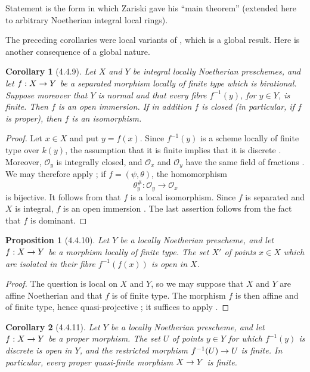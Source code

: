 \documentclass[oneside]{amsart}
\theoremstyle{ega-env-style}
\theoremstyle{ega-thm-env-style}
\newtheorem*{proposition}{Proposition}
\newtheorem*{corollary}{Corollary}
\theoremstyle{ega-defn-env-style}
\def\mathcal{\mathscr}
\def\sh{\mathcal}                   %
\def\kres{k}                        %
\renewcommand{\to}{\mathchoice{\longrightarrow}{\rightarrow}{\rightarrow}{\rightarrow}}
\newcommand{\oldpage}[2][]{{\marginnote{\normalfont{\textbf{#1}~|~#2}}}\ignorespaces}
\let\EGAOriginalLabel\label
\renewcommand{\label}[1]{\phantomsection\EGAOriginalLabel{#1}}
\begin{document}
Statement  is the form in which Zariski gave his
``main theorem'' (extended here to arbitrary Noetherian integral
local rings).

The preceding corollaries were local variants of
, which is a global result.  Here is another
consequence of a global nature.

\begin{corollary}[4.4.9]
\label{III.4.4.9}
Let $X$ and $Y$ be integral locally Noetherian preschemes, and let
$f:X\to Y$ be a separated morphism locally of finite type which is
birational.  Suppose moreover that $Y$ is normal and that every
fibre $f^{-1}(y)$, for $y\in Y$, is finite.  Then $f$ is an open
immersion.  If in addition $f$ is closed (in particular, if $f$ is
proper), then $f$ is an isomorphism.
\end{corollary}

\begin{proof}
Let $x\in X$ and put $y=f(x)$.  Since $f^{-1}(y)$ is a scheme
locally of finite type over $\kres(y)$, the assumption that it is finite implies
that it is discrete .  Moreover, $\sh{O}_y$ is
integrally closed, and $\sh{O}_x$ and $\sh{O}_y$ have the same field
of fractions .  We may therefore apply
; if $f=(\psi,\theta)$, the homomorphism
\[
  \theta_y^\#:\sh{O}_y\longrightarrow\sh{O}_x
\]
is bijective.  It follows from  that $f$ is a local
isomorphism.  Since $f$ is separated and $X$ is integral, $f$ is an
open immersion .  The last assertion follows from
the fact that $f$ is dominant.
\end{proof}

\begin{proposition}[4.4.10]
\label{III.4.4.10}
Let $Y$ be a locally Noetherian prescheme, and let $f:X\to Y$ be a
morphism locally of finite type.  The set $X'$ of points $x\in X$
which are isolated in their fibre $f^{-1}(f(x))$ is open in $X$.
\end{proposition}

\begin{proof}
The question is local on $X$ and $Y$, so we may suppose that $X$ and
$Y$ are affine Noetherian and that $f$ is of finite type.  The
morphism $f$ is then affine and of finite type, hence quasi-projective
; it suffices to apply .
\end{proof}

\oldpage[III]{138}

\begin{corollary}[4.4.11]
\label{III.4.4.11}
Let $Y$ be a locally Noetherian prescheme, and let $f:X\to Y$ be a
proper morphism.  The set $U$ of points $y\in Y$ for which
$f^{-1}(y)$ is discrete is open in $Y$, and the restricted morphism
$f^{-1}(U)\to U$ is finite.  In particular, every proper
quasi-finite morphism $X\to Y$ is finite.
\end{corollary}
\end{document}
